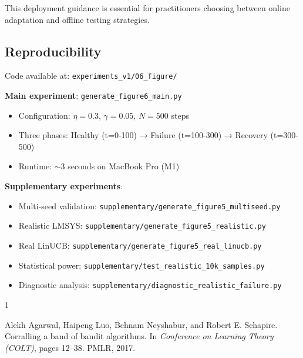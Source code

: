 This deployment guidance is essential for practitioners choosing between online adaptation and offline testing strategies.

\subsection{Reproducibility}

Code available at: \texttt{experiments\_v1/06\_figure/}

\textbf{Main experiment}: \texttt{generate\_figure6\_main.py}
\begin{itemize}
    \item Configuration: $\eta=0.3$, $\gamma=0.05$, $N=500$ steps
    \item Three phases: Healthy (t=0-100) → Failure (t=100-300) → Recovery (t=300-500)
    \item Runtime: $\sim$3 seconds on MacBook Pro (M1)
\end{itemize}

\textbf{Supplementary experiments}:
\begin{itemize}
    \item Multi-seed validation: \texttt{supplementary/generate\_figure5\_multiseed.py}
    \item Realistic LMSYS: \texttt{supplementary/generate\_figure5\_realistic.py}
    \item Real LinUCB: \texttt{supplementary/generate\_figure5\_real\_linucb.py}
    \item Statistical power: \texttt{supplementary/test\_realistic\_10k\_samples.py}
    \item Diagnostic analysis: \texttt{supplementary/diagnostic\_realistic\_failure.py}
\end{itemize}


\begin{thebibliography}{1}

Alekh Agarwal, Haipeng Luo, Behnam Neyshabur, and Robert E. Schapire.
\newblock Corralling a band of bandit algorithms.
\newblock In \emph{Conference on Learning Theory (COLT)}, pages 12--38. PMLR, 2017.

\end{thebibliography}
